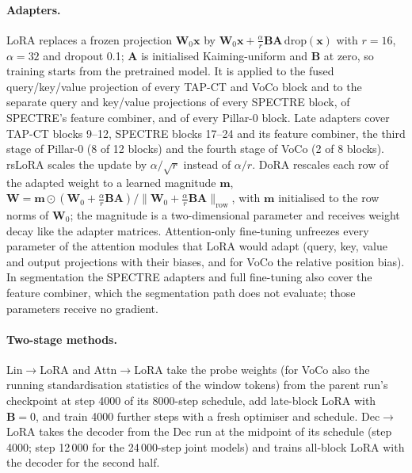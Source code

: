 \paragraph{Adapters.} LoRA \citep{hu2022lora} replaces a frozen projection $\bm{W}_0\bm{x}$ by $\bm{W}_0\bm{x}+\tfrac{\alpha}{r}\bm{B}\bm{A}\,\mathrm{drop}(\bm{x})$ with $r=16$, $\alpha=32$ and dropout 0.1; $\bm{A}$ is initialised Kaiming-uniform and $\bm{B}$ at zero, so training starts from the pretrained model. It is applied to the fused query/key/value projection of every TAP-CT and VoCo block and to the separate query and key/value projections of every SPECTRE block, of SPECTRE's feature combiner, and of every Pillar-0 block. Late adapters cover TAP-CT blocks 9--12, SPECTRE blocks 17--24 and its feature combiner, the third stage of Pillar-0 (8 of 12 blocks) and the fourth stage of VoCo (2 of 8 blocks). rsLoRA scales the update by $\alpha/\sqrt{r}$ instead of $\alpha/r$. DoRA \citep{liu2024dora} rescales each row of the adapted weight to a learned magnitude $\bm{m}$, $\bm{W}=\bm{m}\odot(\bm{W}_0+\tfrac{\alpha}{r}\bm{B}\bm{A})/\lVert\bm{W}_0+\tfrac{\alpha}{r}\bm{B}\bm{A}\rVert_{\text{row}}$, with $\bm{m}$ initialised to the row norms of $\bm{W}_0$; the magnitude is a two-dimensional parameter and receives weight decay like the adapter matrices. Attention-only fine-tuning unfreezes every parameter of the attention modules that LoRA would adapt (query, key, value and output projections with their biases, and for VoCo the relative position bias). In segmentation the SPECTRE adapters and full fine-tuning also cover the feature combiner, which the segmentation path does not evaluate; those parameters receive no gradient.

\paragraph{Two-stage methods.} Lin$\to$LoRA and Attn$\to$LoRA take the probe weights (for VoCo also the running standardisation statistics of the window tokens) from the parent run's checkpoint at step 4000 of its 8000-step schedule, add late-block LoRA with $\bm{B}=0$, and train 4000 further steps with a fresh optimiser and schedule. Dec$\to$LoRA takes the decoder from the Dec run at the midpoint of its schedule (step 4000; step 12\,000 for the 24\,000-step joint models) and trains all-block LoRA with the decoder for the second half.

